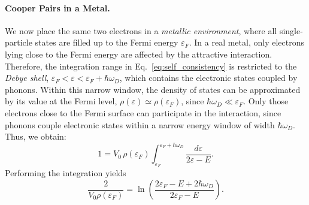 \paragraph{Cooper Pairs in a Metal.}
We now place the same two electrons in a \emph{metallic environment}, where all single-particle states are filled up to the Fermi energy \(\varepsilon_F\). In a real metal, only electrons lying close to the Fermi energy are affected by the attractive interaction.
Therefore, the integration range in Eq.~\eqref{eq:self_consistency} is restricted to the \emph{Debye shell},
\(\varepsilon_F < \varepsilon < \varepsilon_F + \hbar\omega_D\),
which contains the electronic states coupled by phonons.
Within this narrow window, the density of states can be approximated by its value at the Fermi level, \(\rho(\varepsilon) \simeq \rho(\varepsilon_F)\), since \(\hbar\omega_D \ll \varepsilon_F\). Only those electrons close to the Fermi surface can participate in the interaction, since phonons couple electronic states within a narrow energy window of width \(\hbar\omega_D\).\\
Thus, we obtain:
\[
1 = V_0\,\rho(\varepsilon_F)
\int_{\varepsilon_F}^{\varepsilon_F+\hbar\omega_D}
\frac{d\varepsilon}{2\varepsilon - E}.
\]
Performing the integration yields
\begin{equation}
\frac{2}{V_0\rho(\varepsilon_F)} =
\ln\!\left(
\frac{2\varepsilon_F - E + 2\hbar\omega_D}{2\varepsilon_F - E}
\right).
\label{eq:cooper_log}
\end{equation}

